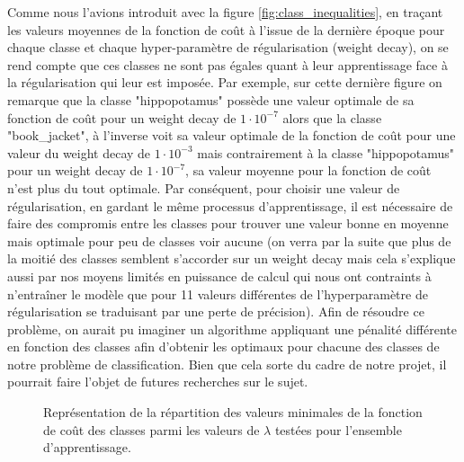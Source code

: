 \documentclass[12pt,english, openany]{book}
\begin{document}
Comme nous l'avions introduit avec la figure \ref{fig:class_inequalities}, en traçant les valeurs moyennes de la fonction de coût à l'issue de la dernière époque pour chaque classe et chaque hyper-paramètre de régularisation (weight decay), on se rend compte que ces classes ne sont pas égales quant à leur apprentissage face à la régularisation qui leur est imposée. Par exemple, sur cette dernière figure on remarque que la classe "hippopotamus" possède une valeur optimale de sa fonction de coût pour un weight decay de $1\cdot 10^{-7}$ alors que la classe "book\_jacket", à l'inverse voit sa valeur optimale de la fonction de coût pour une valeur du weight decay de $1\cdot 10^{-3}$ mais contrairement à la classe "hippopotamus" pour un weight decay de $1\cdot 10^{-7}$, sa valeur moyenne pour la fonction de coût n'est plus du tout optimale. Par conséquent, pour choisir une valeur de régularisation, en gardant le même processus d'apprentissage, il est nécessaire de faire des compromis entre les classes pour trouver une valeur bonne en moyenne mais optimale pour peu de classes voir aucune (on verra par la suite que plus de la moitié des classes semblent s'accorder sur un weight decay mais cela s'explique aussi par nos moyens limités en puissance de calcul qui nous ont contraints à n'entraîner le modèle que pour 11 valeurs différentes de l'hyperparamètre de régularisation se traduisant par une perte de précision). Afin de résoudre ce problème, on aurait pu imaginer un algorithme appliquant une pénalité différente en fonction des classes afin d'obtenir les optimaux pour chacune des classes de notre problème de classification. Bien que cela sorte du cadre de notre projet, il pourrait faire l'objet de futures recherches sur le sujet.\\

\begin{figure}[H]
  \centering
  \hfill
  \hfill
\caption{Représentation de la répartition des valeurs minimales de la fonction de coût des classes parmi les valeurs de $\lambda$ testées pour l'ensemble d'apprentissage.}
  \label{fig:class_wd_train}
\end{figure}
\end{document}
